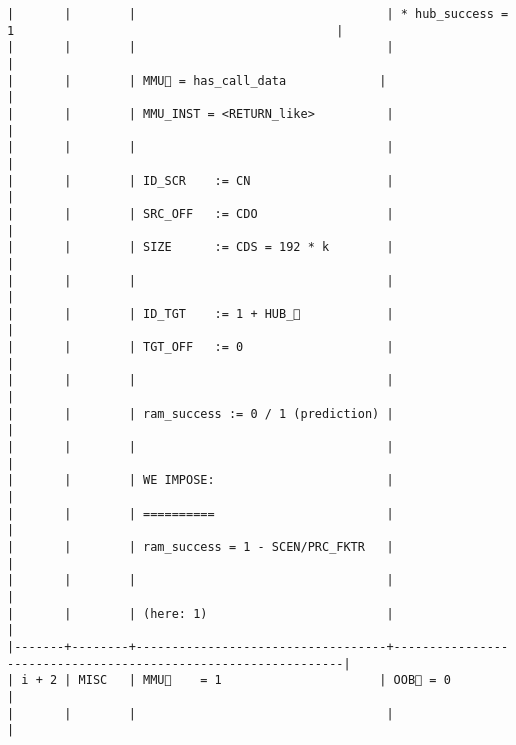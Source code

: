 \documentclass[varwidth=\maxdimen,margin=0.5cm,multi={verbatim}]{standalone}
\begin{document}
\begin{verbatim}
|       |        |                                   | * hub_success = 1                                             |
|       |        |                                   |                                                               |
|       |        | MMU🚩 = has_call_data             |                                                               |
|       |        | MMU_INST = <RETURN_like>          |                                                               |
|       |        |                                   |                                                               |
|       |        | ID_SCR    := CN                   |                                                               |
|       |        | SRC_OFF   := CDO                  |                                                               |
|       |        | SIZE      := CDS = 192 * k        |                                                               |
|       |        |                                   |                                                               |
|       |        | ID_TGT    := 1 + HUB_            |                                                               |
|       |        | TGT_OFF   := 0                    |                                                               |
|       |        |                                   |                                                               |
|       |        | ram_success := 0 / 1 (prediction) |                                                               |
|       |        |                                   |                                                               |
|       |        | WE IMPOSE:                        |                                                               |
|       |        | ==========                        |                                                               |
|       |        | ram_success = 1 - SCEN/PRC_FKTR   |                                                               |
|       |        |                                   |                                                               |
|       |        | (here: 1)                         |                                                               |
|-------+--------+-----------------------------------+---------------------------------------------------------------|
| i + 2 | MISC   | MMU🚩    = 1                      | OOB🚩 = 0                                                     |
|       |        |                                   |                                                               |

\end{verbatim}
\end{document}
